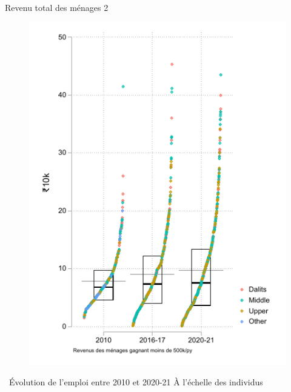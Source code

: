 \documentclass[aspectratio=169]{beamer}
\begin{document}
\begin{frame}[plain, shrink=2]{Revenu total des ménages 2}
\begin{figure}[htpb]
\centering
\includegraphics[scale=0.9]{INPUT/inc_hh500k.pdf}
\end{figure}
\end{frame}



\begin{frame}{\faCommentsO ~Évolution de l'emploi entre 2010 et 2020-21}
    \centering
    {\fontsize{20}{30}\selectfont À l'échelle des individus}
\end{frame}
\end{document}

